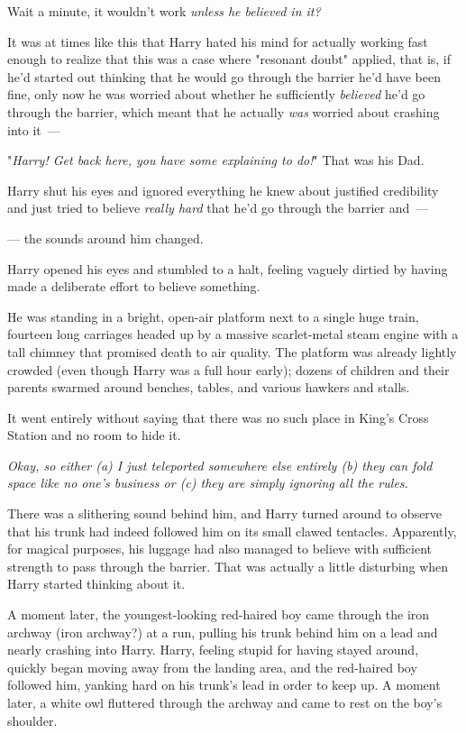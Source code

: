 Wait a minute, it wouldn't work \emph{unless he believed in it?}

It was at times like this that Harry hated his mind for actually working fast
enough to realize that this was a case where "resonant doubt" applied, that is,
if he'd started out thinking that he would go through the barrier he'd have
been fine, only now he was worried about whether he sufficiently
\emph{believed} he'd go through the barrier, which meant that he actually
\emph{was} worried about crashing into it~---

"\emph{Harry! Get back here, you have some explaining to do!}" That was his Dad.

Harry shut his eyes and ignored everything he knew about justified credibility
and just tried to believe \emph{really hard} that he'd go through the barrier
and~---

--- the sounds around him changed.

Harry opened his eyes and stumbled to a halt, feeling vaguely dirtied by having
made a deliberate effort to believe something.

He was standing in a bright, open-air platform next to a single huge train,
fourteen long carriages headed up by a massive scarlet-metal steam engine with
a tall chimney that promised death to air quality. The platform was already
lightly crowded (even though Harry was a full hour early); dozens of children
and their parents swarmed around benches, tables, and various hawkers and
stalls.

It went entirely without saying that there was no such place in King's Cross
Station and no room to hide it.

\emph{Okay, so either (a) I just teleported somewhere else entirely (b) they
can fold space like no one's business or (c) they are simply ignoring all the
rules.}

There was a slithering sound behind him, and Harry turned around to observe
that his trunk had indeed followed him on its small clawed tentacles.
Apparently, for magical purposes, his luggage had also managed to believe with
sufficient strength to pass through the barrier. That was actually a little
disturbing when Harry started thinking about it.

A moment later, the youngest-looking red-haired boy came through the iron
archway (iron archway?) at a run, pulling his trunk behind him on a lead and
nearly crashing into Harry. Harry, feeling stupid for having stayed around,
quickly began moving away from the landing area, and the red-haired boy
followed him, yanking hard on his trunk's lead in order to keep up. A moment
later, a white owl fluttered through the archway and came to rest on the boy's
shoulder.

